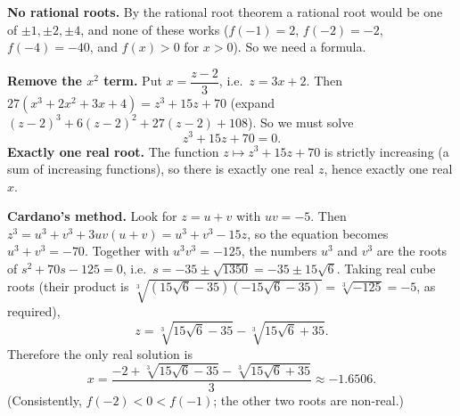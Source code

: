 \textbf{No rational roots.} By the rational root theorem a rational root would be one of $\pm1,\pm2,\pm4$, and none of these works ($f(-1)=2$, $f(-2)=-2$, $f(-4)=-40$, and $f(x)>0$ for $x>0$). So we need a formula.

\textbf{Remove the $x^2$ term.} Put $x=\dfrac{z-2}{3}$, i.e.\ $z=3x+2$. Then $27\left(x^3+2x^2+3x+4\right)=z^3+15z+70$ (expand $(z-2)^3+6(z-2)^2+27(z-2)+108$). So we must solve
\[
z^3+15z+70=0 .
\]
\textbf{Exactly one real root.} The function $z\mapsto z^3+15z+70$ is strictly increasing (a sum of increasing functions), so there is exactly one real $z$, hence exactly one real $x$.

\textbf{Cardano's method.} Look for $z=u+v$ with $uv=-5$. Then $z^3=u^3+v^3+3uv(u+v)=u^3+v^3-15z$, so the equation becomes $u^3+v^3=-70$. Together with $u^3v^3=-125$, the numbers $u^3$ and $v^3$ are the roots of $s^2+70s-125=0$, i.e.\ $s=-35\pm\sqrt{1350}=-35\pm15\sqrt6$. Taking real cube roots (their product is $\sqrt[3]{(15\sqrt6-35)(-15\sqrt6-35)}=\sqrt[3]{-125}=-5$, as required),
\[
z=\sqrt[3]{15\sqrt6-35}-\sqrt[3]{15\sqrt6+35}.
\]
Therefore the only real solution is
\[
\boxed{x=\dfrac{-2+\sqrt[3]{15\sqrt6-35}-\sqrt[3]{15\sqrt6+35}}{3}}\approx-1.6506 .
\]
(Consistently, $f(-2)<0<f(-1)$; the other two roots are non-real.)
